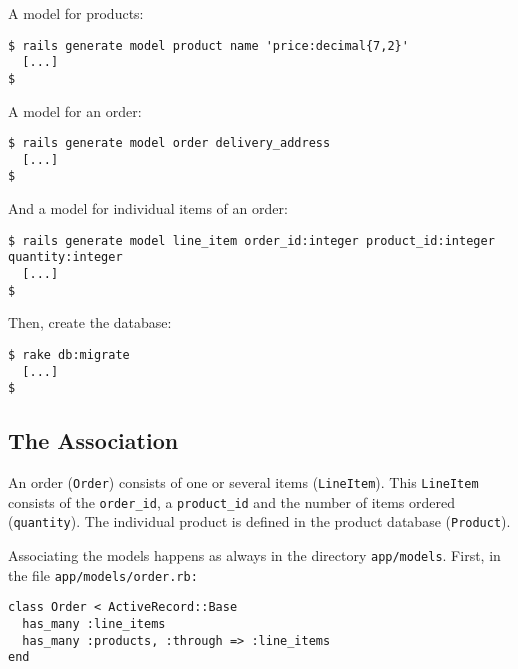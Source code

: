 \documentclass[a4paper]{book}
\newcounter{tab}[chapter]
\begin{document}
A model for products:

\begin{shaded}\begin{verbatim}
$ rails generate model product name 'price:decimal{7,2}'
  [...]
$
\end{verbatim}\end{shaded}

A model for an order:

\begin{shaded}\begin{verbatim}
$ rails generate model order delivery_address
  [...]
$
\end{verbatim}\end{shaded}

And a model for individual items of an order:

\begin{shaded}\begin{verbatim}
$ rails generate model line_item order_id:integer product_id:integer quantity:integer
  [...]
$
\end{verbatim}\end{shaded}

Then, create the database:

\begin{shaded}\begin{verbatim}
$ rake db:migrate
  [...]
$
\end{verbatim}\end{shaded}

\subsection{The Association}\label{the-association}

An order (\texttt{Order}) consists of one or several items (\texttt{LineItem}). This \texttt{LineItem} consists of the \texttt{order\_id}, a \texttt{product\_id} and the number of items ordered (\texttt{quantity}). The individual product is defined in the product database (\texttt{Product}).

Associating the models happens as always in the directory \texttt{app/models}. First, in the file \texttt{app/models/order.rb:}

\begin{shaded}\begin{verbatim}
class Order < ActiveRecord::Base
  has_many :line_items
  has_many :products, :through => :line_items
end
\end{verbatim}\end{shaded}
\end{document}
